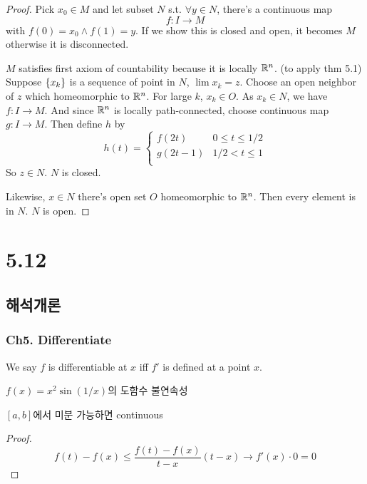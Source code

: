 \documentclass{article}
\begin{document}
\begin{proof}
    Pick $x_0 \in M$ and let subset $N$ s.t. $\forall y \in N$, there's a continuous map 
    \[
        f: I \to M
    \] with $f(0)=x_0 \wedge f(1)=y$. If we show this is closed and open, it becomes $M$ otherwise it is disconnected.

    $M$ satisfies first axiom of countability because it is locally $\mathbb{R}^n$. (to apply thm 5.1) Suppose $\left\{ x_k \right\}$ is a sequence of point in $N$, $\lim x_k = z$. Choose an open neighbor of $z$ which homeomorphic to $\mathbb{R}^n$. For large $k$, $x_k \in O$. As $x_k \in N$, we have $f: I \to M$. And since $\mathbb{R}^n$ is locally path-connected, choose continuous map $g: I \to M$. Then define $h$ by
    \[
        h(t)=\begin{cases}
            f(2t) & 0 \leq t \leq 1/2 \\
            g(2t-1) & 1/2 < t \leq 1 \\
        \end{cases}
    \] So $z \in N$. $N$ is closed.

    Likewise, $x \in N$ there's open set $O$ homeomorphic to $\mathbb{R}^n$. Then every element is in $N$. $N$ is open.
\end{proof}

\section*{5.12}

\subsection{해석개론}

\subsubsection{Ch5. Differentiate}

\begin{definition}
    We say $f$ is differentiable at $x$ iff $f'$ is defined at a point $x$.
\end{definition}

$f(x)=x^2 \sin(1/x)$의 도함수 불연속성

\begin{theorem}
$[a,b]$에서 미분 가능하면 continuous
\end{theorem}
\begin{proof}
    \[
        f(t)-f(x) \leq \frac{f(t)-f(x)}{t-x} (t-x) \to f'(x) \cdot 0 =0
    \]
\end{proof}
\end{document}
